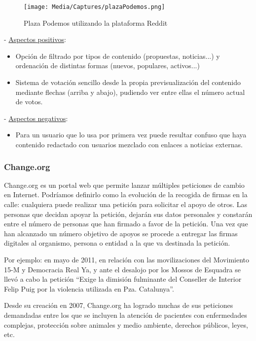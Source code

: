 \begin{figure}[H]
\centering
\texttt{[image: Media/Captures/plazaPodemos.png]}
\caption{Plaza Podemos utilizando la plataforma Reddit}
\label{fig:plazaPodemos}
\end{figure}

 - \underline{Aspectos positivos}:

\begin{itemize}
	\item Opción de filtrado por tipos de contenido (propuestas, noticias...) y ordenación de distintas formas (nuevos, populares, activos...)
	\item Sistema de votación sencillo desde la propia previsualización del contenido mediante flechas (arriba y abajo), pudiendo ver entre ellas el número actual de votos.
\end{itemize}

 - \underline{Aspectos negativos}:

\begin{itemize}
	\item Para un usuario que lo usa por primera vez puede resultar confuso que haya contenido redactado con usuarios mezclado con enlaces a noticias externas.
\end{itemize}

\subsubsection{Change.org}

Change.org \cite{ref:changeOrg} es un portal web que permite lanzar múltiples peticiones de cambio en Internet. Podríamos definirlo como la evolución de la recogida de firmas en la calle: cualquiera puede realizar una petición para solicitar el apoyo de otros. Las personas que decidan apoyar la petición, dejarán sus datos personales y constarán entre el número de personas que han firmado a favor de la petición. Una vez que han alcanzado un número objetivo de apoyos se procede a entregar las firmas digitales al organismo, persona o entidad a la que va destinada la petición.

Por ejemplo: en mayo de 2011, en relación con las movilizaciones del Movimiento 15-M y Democracia Real Ya, y ante el desalojo por los Mossos de Esquadra se llevó a cabo la petición “Exige la dimisión fulminante del Conseller de Interior Felip Puig por la violencia utilizada en Pza. Catalunya”.

Desde su creación en 2007, Change.org ha logrado muchas de sus peticiones demandadas entre los que se incluyen la atención de pacientes con enfermedades complejas, protección sobre animales y medio ambiente, derechos públicos, leyes, etc.

